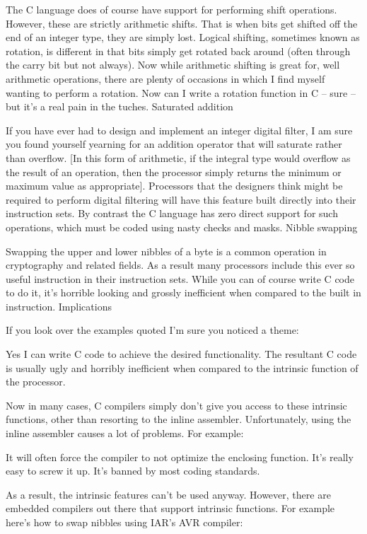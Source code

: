 {{{{{{{{{{The C language does of course have support for performing shift operations. However, these are strictly arithmetic shifts. That is when bits get shifted off the end of an integer type, they are simply lost. Logical shifting, sometimes known as rotation, is different in that bits simply get rotated back around (often through the carry bit but not always). Now while arithmetic shifting is great for, well arithmetic operations, there are plenty of occasions in which I find myself wanting to perform a rotation. Now can I write a rotation function in C – sure – but it’s a real pain in the tuches.
Saturated addition

If you have ever had to design and implement an integer digital filter, I am sure you found yourself yearning for an addition operator that will saturate rather than overflow. [In this form of arithmetic, if the integral type would overflow as the result of an operation, then the processor simply returns the minimum or maximum value as appropriate].  Processors that the designers think might be required to perform digital filtering will have this feature built directly into their instruction sets.  By contrast the C language has zero direct support for such operations, which must be coded using nasty checks and masks.
Nibble swapping

Swapping the upper and lower nibbles of a byte is a common operation in cryptography and related fields. As a result many processors include this ever so useful instruction in their instruction sets. While you can of course write C code to do it, it’s horrible looking and grossly inefficient when compared to the built in instruction.
Implications

If you look over the examples quoted I’m sure you noticed a theme:

    Yes I can write C code to achieve the desired functionality.
    The resultant C code is usually ugly and horribly inefficient when compared to the intrinsic function of the processor.

Now in many cases, C compilers simply don’t give you access to these intrinsic functions, other than resorting to the inline assembler. Unfortunately, using the inline assembler causes a lot of problems. For example:

    It will often force the compiler to not optimize the enclosing function.
    It’s really easy to screw it up.
    It’s banned by most coding standards.

As a result, the intrinsic features can’t be used anyway. However, there are embedded compilers out there that support intrinsic functions. For example here’s how to swap nibbles using IAR’s AVR compiler:

}}}}}}}}}}
